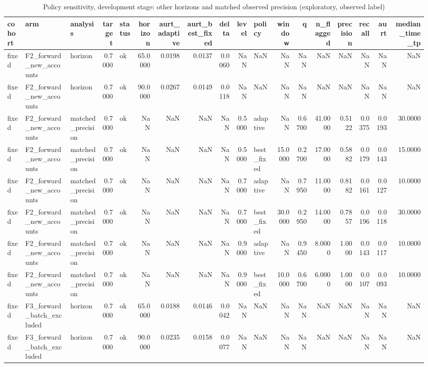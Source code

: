 \begin{table}
\caption{Policy sensitivity, development stage: other horizons and matched observed precision (exploratory, observed label)}
\label{tab:tab_policy_sensitivity}
\begin{tabular}{lllrlrrrrrlrrrrrrr}
\toprule
cohort & arm & analysis & target & status & horizon & aurt\_adaptive & aurt\_best\_fixed & delta & level & policy & window & q & n\_flagged & precision & recall & aurt & median\_time\_tp \\
\midrule
fixed & F2\_forward\_new\_accounts & horizon & 0.7000 & ok & 65.0000 & 0.0198 & 0.0137 & 0.0060 & NaN & NaN & NaN & NaN & NaN & NaN & NaN & NaN & NaN \\
fixed & F2\_forward\_new\_accounts & horizon & 0.7000 & ok & 90.0000 & 0.0267 & 0.0149 & 0.0118 & NaN & NaN & NaN & NaN & NaN & NaN & NaN & NaN & NaN \\
fixed & F2\_forward\_new\_accounts & matched\_precision & 0.7000 & ok & NaN & NaN & NaN & NaN & 0.5000 & adaptive & NaN & 0.6700 & 41.0000 & 0.5122 & 0.0375 & 0.0193 & 30.0000 \\
fixed & F2\_forward\_new\_accounts & matched\_precision & 0.7000 & ok & NaN & NaN & NaN & NaN & 0.5000 & best\_fixed & 15.0000 & 0.2700 & 17.0000 & 0.5882 & 0.0179 & 0.0143 & 15.0000 \\
fixed & F2\_forward\_new\_accounts & matched\_precision & 0.7000 & ok & NaN & NaN & NaN & NaN & 0.7000 & adaptive & NaN & 0.7950 & 11.0000 & 0.8182 & 0.0161 & 0.0127 & 10.0000 \\
fixed & F2\_forward\_new\_accounts & matched\_precision & 0.7000 & ok & NaN & NaN & NaN & NaN & 0.7000 & best\_fixed & 30.0000 & 0.2950 & 14.0000 & 0.7857 & 0.0196 & 0.0118 & 30.0000 \\
fixed & F2\_forward\_new\_accounts & matched\_precision & 0.7000 & ok & NaN & NaN & NaN & NaN & 0.9000 & adaptive & NaN & 0.9450 & 8.0000 & 1.0000 & 0.0143 & 0.0117 & 10.0000 \\
fixed & F2\_forward\_new\_accounts & matched\_precision & 0.7000 & ok & NaN & NaN & NaN & NaN & 0.9000 & best\_fixed & 10.0000 & 0.6700 & 6.0000 & 1.0000 & 0.0107 & 0.0093 & 10.0000 \\
fixed & F3\_forward\_batch\_excluded & horizon & 0.7000 & ok & 65.0000 & 0.0188 & 0.0146 & 0.0042 & NaN & NaN & NaN & NaN & NaN & NaN & NaN & NaN & NaN \\
fixed & F3\_forward\_batch\_excluded & horizon & 0.7000 & ok & 90.0000 & 0.0235 & 0.0158 & 0.0077 & NaN & NaN & NaN & NaN & NaN & NaN & NaN & NaN & NaN \\

\end{tabular}
\end{table}
